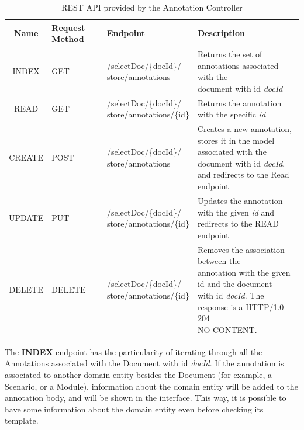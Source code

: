 \documentclass{llncs}
\begin{document}
\begin{table}
\begin{tabular}{ | c | m{1.5cm} | m{3.5cm} |m{7.7cm}|}
    \hline
    \textbf{Name} & \textbf{Request} \textbf{Method }& \textbf{Endpoint} & \textbf{Description}\\ \hline
	INDEX & GET & \parbox[c][1.5cm]{3.5cm}{/selectDoc/\{docId\}/\\store/annotations} & \parbox[c]{8cm}{Returns the set of annotations associated with the \\document with id \textit{docId} }\\ \hline
   	READ & GET & \parbox[c][1.5cm]{3.5cm}{/selectDoc/\{docId\}/\\store/annotations/\{id\}} & Returns the annotation with the specific \textit{id} \\ \hline
    CREATE & POST & \parbox[c]{3.5cm}{/selectDoc/\{docId\}/\\store/annotations} & \parbox[c][1.5cm]{8cm}{Creates a new annotation, stores it in the model \\associated with the document with id \textit{docId}, \\ and redirects to the Read endpoint} \\ \hline
    UPDATE & PUT & \parbox[c][1.5cm]{3.5cm}{/selectDoc/\{docId\}/\\store/annotations/\{id\}} & \parbox[c]{8cm}{Updates the annotation with the given \textit{id} and \\redirects to the READ endpoint} \\ \hline
    DELETE & DELETE & \parbox[t]{3.5cm}{/selectDoc/\{docId\}/\\store/annotations/\{id\}} & \parbox[c][2cm]{8cm}{Removes the association between the \\ annotation with the given id and the document \\ with id \textit{docId}. The response is a HTTP/1.0 204 \\ NO CONTENT.} \\ \hline
  \end{tabular}
  \caption{REST API provided by the Annotation Controller}
  \label{table:endpoints}
\end{table}

The \textbf{INDEX} endpoint has the particularity of iterating through all the Annotations associated with the Document with id \textit{docId}. If the annotation is associated to another domain entity besides the Document (for example, a Scenario, or a Module), information about the domain entity will be added to the annotation body, and will be shown in the interface. This way, it is possible to have some information about the domain entity even before checking its template. 
\end{document}
